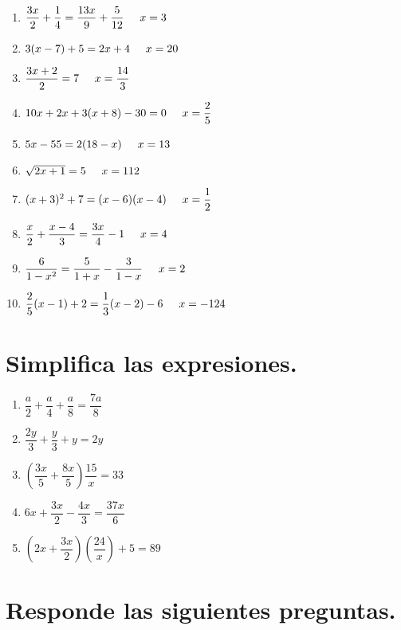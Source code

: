 \documentclass[12pt]{article}
\begin{document}
\begin{enumerate}
\item $\dfrac{3 x}{2} + \dfrac{1}{4} = \dfrac{13 x}{9} + \dfrac{5}{12} \hspace{0.5cm} x = 3$
\item $3 (x - 7) + 5 = 2 x + 4 \hspace{0.5cm} x = 20$
\item $\dfrac{3 x + 2}{2} = 7 \hspace{0.5cm} x = \dfrac{14}{3}$
\item $10 x + 2 x + 3 (x + 8) - 30 = 0 \hspace{0.5cm} x = \dfrac{2}{5}$
\item $5 x - 55 = 2 (18 - x) \hspace{0.5cm} x = 13$
\item $\sqrt{2 x + 1} = 5 \hspace{0.5cm} x =112$
\item $(x + 3)^{2} + 7 = (x - 6)(x - 4) \hspace{0.5cm} x = \dfrac{1}{2}$
\item $\dfrac{x}{2} + \dfrac{x - 4}{3} = \dfrac{3 x}{4} - 1 \hspace{0.5cm} x = 4$
\item $\dfrac{6}{1 -x^{2}} = \dfrac{5}{1 + x} - \dfrac{3}{1 - x} \hspace{0.5cm} x = 2$
\item $\dfrac{2}{5} (x - 1) + 2 = \dfrac{1}{3} (x - 2) - 6 \hspace{0.5cm} x = -124$
\end{enumerate}

\section{Simplifica las expresiones.}

\begin{enumerate}
\item $\dfrac{a}{2} + \dfrac{a}{4} + \dfrac{a}{8} = \dfrac{7 a}{8}$
\item $\dfrac{2 y}{3} + \dfrac{y}{3} + y = 2 y$
\item $\left( \dfrac{3 x}{5} + \dfrac{8 x}{5} \right) \dfrac{15}{x} = 33$
\item $6 x + \dfrac{3 x}{2} - \dfrac{4 x}{3} = \dfrac{37 x}{6}$
\item $\left( 2 x + \dfrac{3 x}{2} \right) \left( \dfrac{24}{x} \right) + 5 = 89$
\end{enumerate}

\section{Responde las siguientes preguntas.}
\end{document}
